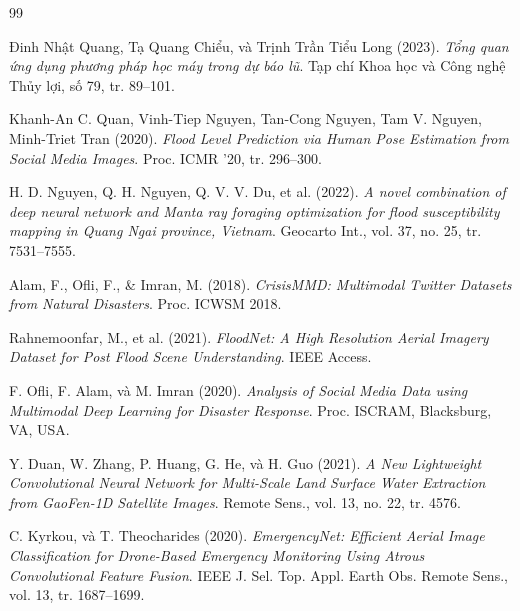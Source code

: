 \documentclass[12pt, a4paper]{report}
\begin{document}
\begin{thebibliography}{99}

Đinh Nhật Quang, Tạ Quang Chiểu, và Trịnh Trần Tiểu Long (2023).
\textit{Tổng quan ứng dụng phương pháp học máy trong dự báo lũ}.
Tạp chí Khoa học và Công nghệ Thủy lợi, số 79, tr. 89--101.

Khanh-An C. Quan, Vinh-Tiep Nguyen, Tan-Cong Nguyen, Tam V. Nguyen, Minh-Triet Tran (2020).
\textit{Flood Level Prediction via Human Pose Estimation from Social Media Images}.
Proc. ICMR '20, tr. 296--300.

H. D. Nguyen, Q. H. Nguyen, Q. V. V. Du, et al. (2022).
\textit{A novel combination of deep neural network and Manta ray foraging optimization for flood susceptibility mapping in Quang Ngai province, Vietnam}.
Geocarto Int., vol. 37, no. 25, tr. 7531--7555.

Alam, F., Ofli, F., \& Imran, M. (2018).
\textit{CrisisMMD: Multimodal Twitter Datasets from Natural Disasters}.
Proc. ICWSM 2018.

Rahnemoonfar, M., et al. (2021).
\textit{FloodNet: A High Resolution Aerial Imagery Dataset for Post Flood Scene Understanding}.
IEEE Access.

F. Ofli, F. Alam, và M. Imran (2020).
\textit{Analysis of Social Media Data using Multimodal Deep Learning for Disaster Response}.
Proc. ISCRAM, Blacksburg, VA, USA.

Y. Duan, W. Zhang, P. Huang, G. He, và H. Guo (2021).
\textit{A New Lightweight Convolutional Neural Network for Multi-Scale Land Surface Water Extraction from GaoFen-1D Satellite Images}.
Remote Sens., vol. 13, no. 22, tr. 4576.

C. Kyrkou, và T. Theocharides (2020).
\textit{EmergencyNet: Efficient Aerial Image Classification for Drone-Based Emergency Monitoring Using Atrous Convolutional Feature Fusion}.
IEEE J. Sel. Top. Appl. Earth Obs. Remote Sens., vol. 13, tr. 1687--1699.

\end{thebibliography}

\appendix
\end{document}
